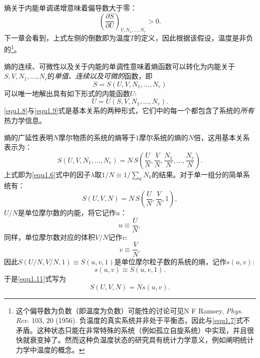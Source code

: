 熵关于内能单调递增意味着偏导数大于零：
\begin{equation}
\label{equ1.7}
	\left( \frac{\partial S}{\partial U} \right)_{V, N_1, \dots, N_r} > 0.
\end{equation}
下一章会看到，上式左侧的倒数即为温度$T$的定义，因此根据该假设，温度是非负的\footnote{这个偏导数为负数（即温度为负数）可能性的讨论可见N F Ramsey, {\it Phys. Rev.} 103, 20 (1956). 负温度的真实系统并非处于平衡态，因此与\eqref{equ1.7}式不矛盾。这种状态只能在非常特殊的系统（例如孤立自旋系统）中实现，并且很快就衰变掉了。然而这种负温度状态的研究具有统计力学意义，例如阐明统计力学中温度的概念。 }。%

熵的连续、可微性以及关于内能的单调性意味着熵函数可以转化为内能关于$S, V, N_1, \dots, N_r$的{\it 单值、连续以及可微的}函数，即
\begin{equation}
\label{equ1.8}
	S = S(U, V, N_1, \dots, N_r)
\end{equation}
可以唯一地解出具有如下形式的内能函数$U$:
\begin{equation}
\label{equ1.9}
	U = U(S, V, N_1, \dots, N_r).
\end{equation}
\eqref{equ1.8}与\eqref{equ1.9}式是基本关系的两种形式，它们中的每一个都包含了系统的{\it 所有}热力学信息。

熵的广延性表明$N$摩尔物质的系统的熵等于$1$摩尔系统的熵的$N$倍，这用基本关系表示为：
\begin{equation}
\label{equ1.10}
	S(U, V, N_1, \dots, N_r) = N\, S \left( \frac{U}{N}, \frac{V}{N}, \frac{N_1}{N}, \dots, \frac{N_r}{N} \right).
\end{equation}
上式即为\eqref{equ1.6}式中的因子$\lambda$取$1/N \equiv 1 / \sum_k N_k$的结果。对于单一组分的简单系统有：
\begin{equation}
\label{equ1.11}
	S(U, V, N) = N\, S \left( \frac{U}{N}, \frac{V}{N}, 1 \right),
\end{equation}
$U/N$是单位摩尔数的内能，将它记作$u$：
\begin{equation}
\label{equ1.12}
	u \equiv \frac{U}{N},
\end{equation}
同样，单位摩尔数对应的体积$V/N$记作$v$:
\begin{equation}
\label{equ1.13}
	v \equiv \frac{V}{N}.
\end{equation}
因此$S(U/N, V/N, 1) \equiv S(u, v, 1)$是单位摩尔粒子数的系统的熵，记作$s(u, v)$:
\begin{equation}
\label{equ1.14}
	s(u, v) \equiv S(u, v, 1).
\end{equation}
于是\eqref{equ1.11}式写为
\begin{equation}
\label{equ1.15}
	S(U, V, N) = N s(u, v).
\end{equation}

